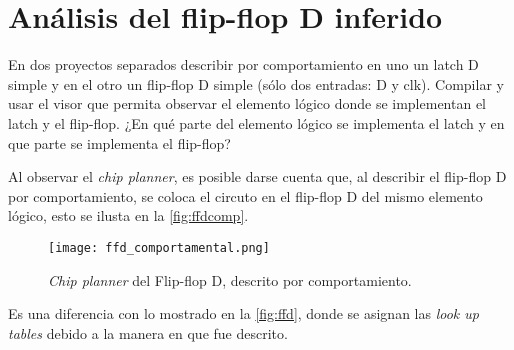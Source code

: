 \section{Análisis del flip-flop D inferido \label{sec:s4}}



\begin{center}
	\begin{minipage}{10cm}
		En dos proyectos separados describir por comportamiento en uno un latch D simple y en el
		otro un flip-flop D simple (sólo dos entradas: D y clk). Compilar y usar el visor que permita
		observar el elemento lógico donde se implementan el latch y el flip-flop. ¿En qué parte del
		elemento lógico se implementa el latch y en que parte se implementa el flip-flop?
	\end{minipage}
\end{center}

\enter

Al observar el \textit{chip planner}, es posible darse cuenta que, al describir el flip-flop D por comportamiento, se coloca el circuto en el flip-flop D del mismo elemento lógico, esto se ilusta en la \autoref{fig:ffdcomp}.
\begin{figure}[ht]
	\centering
	
	\texttt{[image: ffd\_comportamental.png]}
	
	\caption{
		\textit{Chip planner} del Flip-flop D, descrito por comportamiento.
		\label{fig:ffdcomp}
	}
\end{figure}

\enter

Es una diferencia con lo mostrado en la \autoref{fig:ffd}, donde se asignan las \textit{look up tables} debido a la manera en que fue descrito.